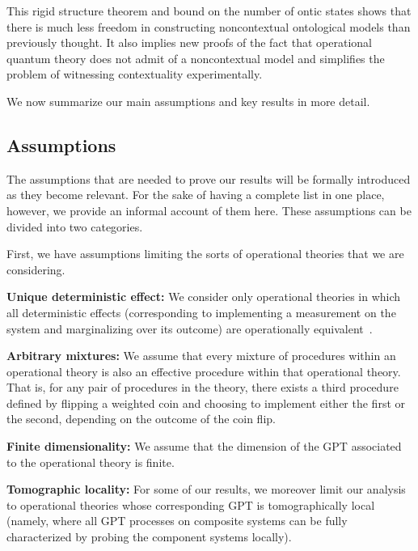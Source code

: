 \documentclass[10pt,twocolumn,aps,groupedaddress,nofootinbib]{revtex4}
\newcommand{\david}{\color{blue}}
\newcommand{\blk}{\color{black}}
\begin{document}
This rigid structure theorem and bound on the number of ontic states shows that there is much less freedom in constructing noncontextual ontological models than previously thought.
 It also implies new proofs of the fact that operational quantum theory does not admit of a noncontextual model and simplifies the problem of witnessing contextuality experimentally.

We now summarize our main assumptions and key results in more detail.


\subsection{Assumptions} \label{secassumptions}

The assumptions that are needed to prove our results
will be formally introduced as they become relevant.
 For the sake of having a complete list in one place, however, we provide an informal account of them here. These assumptions can be divided into two categories.

First, we have assumptions limiting the sorts of operational theories that we are considering.
\ben
\item {\bf Unique deterministic effect:} We consider only operational theories
in which all deterministic effects (corresponding to implementing a measurement on the system and marginalizing over its outcome) are operationally equivalent~\cite{chiribella2010probabilistic}.
\item {\bf Arbitrary mixtures:} We assume that every mixture of procedures within an operational theory is also an effective procedure within that operational theory. That is, for any pair of procedures in the theory, there exists a third procedure defined by flipping
a weighted coin and choosing to implement either the first or the second, depending on the outcome of the coin flip.
\item  {\bf Finite dimensionality:} We assume that the dimension of the GPT associated to the operational theory is finite.
\item {\bf Tomographic locality:} For some of our results, we moreover limit our analysis to operational theories 
 whose corresponding GPT is tomographically local (namely, where all GPT processes on composite systems can be fully characterized by probing the component systems locally).  
\een
\end{document}

